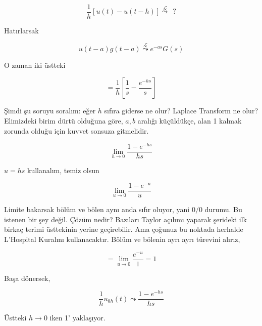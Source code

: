\documentclass[12pt,fleqn]{article}\usepackage{../../common}
\begin{document}
$$ \frac{1}{h} [ u(t) - u(t-h) ] 
\stackrel{\mathcal{L}}{\leadsto} \ \ ?
$$

Hatırlarsak

$$ u(t-a)g(t-a) \stackrel{\mathcal{L}}{\leadsto}  e^{-as}G(s) $$

O zaman iki üstteki

$$ = \frac{1}{h}[ \frac{1}{s} - \frac{e^{-hs}}{s} ]$$

Şimdi şu soruyu soralım: eğer $h$ sıfıra giderse ne olur? Laplace Transform
ne olur? Elimizdeki birim dürtü olduğuna göre, $a,b$ aralığı küçüldükçe,
alan 1 kalmak zorunda olduğu için kuvvet sonsuza gitmelidir. 

$$ \lim_{h \to 0} \frac{1-e^{-hs}}{hs} $$

$u=hs$ kullanalım, temiz olsun 

$$ \lim_{u \to 0} \frac{1-e^{-u}}{u} $$

Limite bakarsak bölüm ve bölen aynı anda sıfır oluyor, yani $0/0$
durumu. Bu istenen bir şey değil. Çözüm nedir? Bazıları Taylor açılımı
yaparak şerideki ilk birkaç terimi üsttekinin yerine geçirebilir. Ama
çoğunuz bu noktada herhalde L'Hospital Kuralını kullanacaktır. Bölüm ve
bölenin ayrı ayrı türevini alırız,

$$ = \lim_{u \to 0} \frac{e^{-u}}{1} = 1$$

Başa dönersek, 

$$ \frac{1}{h}u_{0h}(t) \leadsto \frac{1-e^{-hs}}{hs} $$

Üstteki $h \to 0$ iken 1' yaklaşıyor.  
\end{document}
